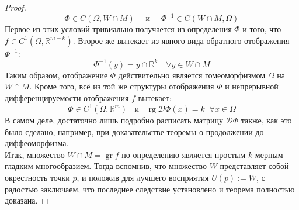 \documentclass[11pt]{article}
\DeclareMathOperator{\rg}{rg}
\DeclareMathOperator{\gr}{gr}
\begin{document}
\begin{proof}
    \[\Phi \in C(\Omega, W \cap M) \quad \text{ и } \quad \Phi^{-1} \in C(W \cap M, \Omega)\]
    Первое из этих условий тривиально получается из определения $\Phi$ и того, что $f \in C^{1} (\Omega, \mathbb{R}^{m - k})$. Второе же вытекает из явного вида обратного отображения $\Phi^{-1}$:
    \[\Phi^{-1}(y) = y \cap \mathbb{R}^k \quad \forall y \in W \cap M\]
    Таким образом, отображение $\Phi$ действительно является гомеоморфизмом $\Omega$ на $W \cap M$. Кроме того, всё из той же структуры отображения $\Phi$ и непрерывной дифференцируемости отображения $f$ вытекает:
    \[\Phi \in C^{1} (\Omega, \mathbb{R}^m) \; \; \text{ и } \; \; \rg \mathcal{D} \Phi (x) = k \; \; \forall x \in \Omega\]
    В самом деле, достаточно лишь подробно расписать матрицу $\mathcal{D}\Phi$ также, как это было сделано, например, при доказательстве теоремы о продолжении до диффеоморфизма. \\
    Итак, множество $W \cap M = \gr f$ по определению является простым $k$-мерным гладким многообразием. Тогда вспомнив, что множество $W$ представляет собой окрестность точки $p$, и положив для лучшего восприятия $U(p) := W$, с радостью заключаем, что последнее следствие установлено и теорема полностью доказана.
\end{proof}
\end{document}
